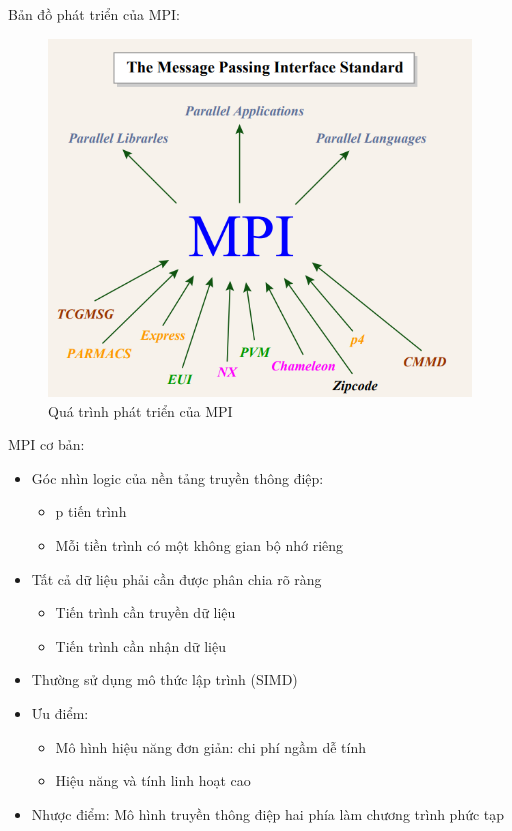 \documentclass[14pt, a4paper]{article}
\numberwithin{equation}{section}
\numberwithin{figure}{section}
\numberwithin{dl}{section}
\numberwithin{md}{section}
\numberwithin{bd}{section}
\numberwithin{dn}{section}
\numberwithin{hq}{section}
\begin{document}
Bản đồ phát triển của MPI:

\begin{figure}[H]
    \centering
    \includegraphics[width=0.75\linewidth]{figures/MPI/MPI_Genealogy.png}
    \caption{Quá trình phát triển của MPI}
\end{figure}

MPI cơ bản:

\begin{itemize}
    \item Góc nhìn logic của nền tảng truyền thông điệp:
    \begin{itemize}
        \item p tiến trình
        \item Mỗi tiền trình có một không gian bộ nhớ riêng
    \end{itemize}
    \item Tất cả dữ liệu phải cần được phân chia rõ ràng
    \begin{itemize}
        \item Tiến trình cần truyền dữ liệu
        \item Tiến trình cần nhận dữ liệu
    \end{itemize}
    \item Thường sử dụng mô thức lập trình (SIMD)
    \item Ưu điểm:
    \begin{itemize}
        \item Mô hình hiệu năng đơn giản: chi phí ngầm dễ tính
        \item Hiệu năng và tính linh hoạt cao
    \end{itemize}
    \item Nhược điểm: Mô hình truyền thông điệp hai phía làm chương trình phức tạp
\end{itemize}
\end{document}
